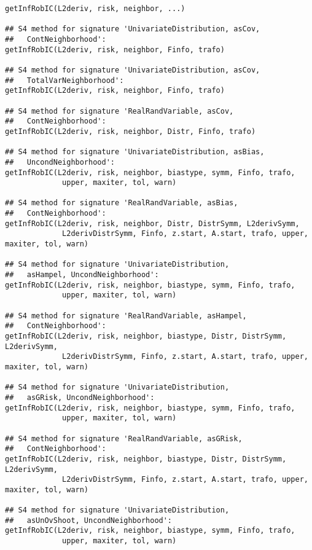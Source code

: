 \begin{Usage}
\begin{verbatim}
getInfRobIC(L2deriv, risk, neighbor, ...)

## S4 method for signature 'UnivariateDistribution, asCov,
##   ContNeighborhood':
getInfRobIC(L2deriv, risk, neighbor, Finfo, trafo)

## S4 method for signature 'UnivariateDistribution, asCov,
##   TotalVarNeighborhood':
getInfRobIC(L2deriv, risk, neighbor, Finfo, trafo)

## S4 method for signature 'RealRandVariable, asCov,
##   ContNeighborhood':
getInfRobIC(L2deriv, risk, neighbor, Distr, Finfo, trafo)

## S4 method for signature 'UnivariateDistribution, asBias,
##   UncondNeighborhood':
getInfRobIC(L2deriv, risk, neighbor, biastype, symm, Finfo, trafo, 
             upper, maxiter, tol, warn)

## S4 method for signature 'RealRandVariable, asBias,
##   ContNeighborhood':
getInfRobIC(L2deriv, risk, neighbor, Distr, DistrSymm, L2derivSymm, 
             L2derivDistrSymm, Finfo, z.start, A.start, trafo, upper, maxiter, tol, warn)

## S4 method for signature 'UnivariateDistribution,
##   asHampel, UncondNeighborhood':
getInfRobIC(L2deriv, risk, neighbor, biastype, symm, Finfo, trafo, 
             upper, maxiter, tol, warn)

## S4 method for signature 'RealRandVariable, asHampel,
##   ContNeighborhood':
getInfRobIC(L2deriv, risk, neighbor, biastype, Distr, DistrSymm, L2derivSymm, 
             L2derivDistrSymm, Finfo, z.start, A.start, trafo, upper, maxiter, tol, warn)

## S4 method for signature 'UnivariateDistribution,
##   asGRisk, UncondNeighborhood':
getInfRobIC(L2deriv, risk, neighbor, biastype, symm, Finfo, trafo, 
             upper, maxiter, tol, warn)

## S4 method for signature 'RealRandVariable, asGRisk,
##   ContNeighborhood':
getInfRobIC(L2deriv, risk, neighbor, biastype, Distr, DistrSymm, L2derivSymm, 
             L2derivDistrSymm, Finfo, z.start, A.start, trafo, upper, maxiter, tol, warn)

## S4 method for signature 'UnivariateDistribution,
##   asUnOvShoot, UncondNeighborhood':
getInfRobIC(L2deriv, risk, neighbor, biastype, symm, Finfo, trafo, 
             upper, maxiter, tol, warn)
\end{verbatim}
\end{Usage}
